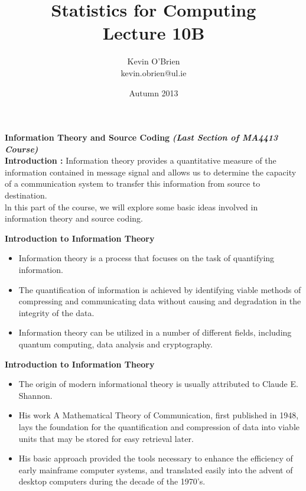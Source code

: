 \documentclass[a4]{beamer}
\title[MA4413]{Statistics for Computing \\ {\normalsize Lecture 10B}}
\author[Kevin O'Brien]{Kevin O'Brien \\ {\scriptsize kevin.obrien@ul.ie}}
\date{Autumn 2013}
\institute[Maths \& Stats]{Dept. of Mathematics \& Statistics, \\ University \textit{of} Limerick}
\begin{document}



\titlepage


\noindent \textbf{Information Theory and Source Coding}
\textbf{\textit{(Last Section of MA4413 Course)}}\\
\bigskip
\textbf{Introduction : } Information theory provides a quantitative measure of the information contained in message signal and allows us to determine the capacity of a communication system to transfer this information from source to destination. \\ \bigskip ln this part of the course, we will explore some basic ideas involved in information theory and source coding.




\noindent \textbf{Introduction to Information Theory}
\begin{itemize}
\item Information theory is a process that focuses on the task of quantifying information. 
\item The quantification of information is achieved by identifying viable methods of compressing and communicating data without causing 
and degradation in the integrity of the data. 
\item Information theory can be utilized in a number of different fields, including quantum computing, 
data analysis and cryptography.
\end{itemize}


\noindent \textbf{Introduction to Information Theory}
\begin{itemize}
\item The origin of modern informational theory is usually attributed to Claude E. Shannon.
\item His work A Mathematical Theory of Communication, first published in 1948, 
lays the foundation for the quantification and compression of data into viable units that may be stored for easy retrieval later. 
\item His basic approach provided the tools necessary to enhance the efficiency of early mainframe computer systems, and translated easily into 
the advent of desktop computers during the decade of the 1970’s.
\end{itemize}
\end{document}
